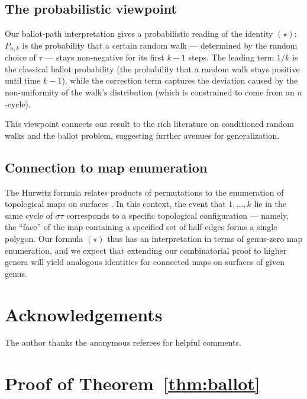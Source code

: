 \documentclass[12pt,a4paper]{article}
\theoremstyle{definition}
\begin{document}
\subsection{The probabilistic viewpoint}

Our ballot-path interpretation gives a probabilistic reading of the
identity $(\star)$: $P_{n,k}$ is the probability that a certain
random walk — determined by the random choice of $\tau$ — stays
non-negative for its first $k-1$ steps.  The leading term $1/k$ is
the classical ballot probability (the probability that a random walk
stays positive until time $k-1$), while the correction term captures
the deviation caused by the non-uniformity of the walk's distribution
(which is constrained to come from an $n$-cycle).

This viewpoint connects our result to the rich literature on conditioned
random walks and the ballot problem, suggesting further avenues for
generalization.

\subsection{Connection to map enumeration}

The Hurwitz formula relates products of permutations to the enumeration
of topological maps on surfaces \cite{LandoZvonkin2004}.  In this context,
the event that $1,\dots,k$ lie in the same cycle of $\sigma\tau$
corresponds to a specific topological configuration — namely, the
``face'' of the map containing a specified set of half-edges forms a
single polygon.  Our formula $(\star)$ thus has an interpretation in
terms of genus-zero map enumeration, and we expect that extending our
combinatorial proof to higher genera will yield analogous identities
for connected maps on surfaces of given genus.

\section*{Acknowledgements}

The author thanks the anonymous referees for helpful comments.

\appendix
\section{Proof of Theorem~\ref{thm:ballot}}
\label{app:ballot}
\end{document}

